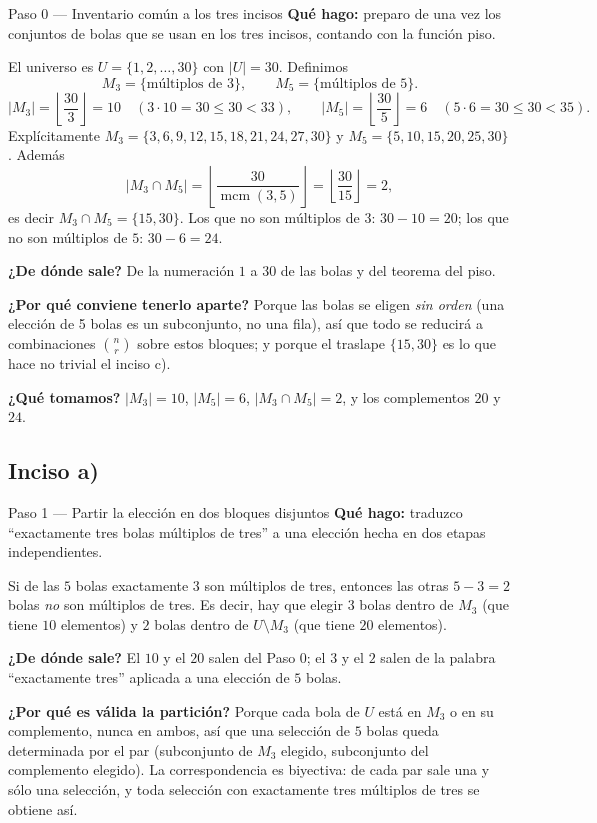 \documentclass[11pt]{article}
\begin{document}
\begin{paso}{Paso 0 --- Inventario común a los tres incisos}
\textbf{Qué hago:} preparo de una vez los conjuntos de bolas que se usan en los tres incisos, contando con la función piso.

El universo es $U=\{1,2,\dots,30\}$ con $|U|=30$. Definimos
\[
M_3 = \{\text{múltiplos de }3\},\qquad M_5=\{\text{múltiplos de }5\} .
\]
\[
|M_3| = \left\lfloor \frac{30}{3}\right\rfloor = 10 \quad (3\cdot 10 = 30\le 30 < 33), \qquad
|M_5| = \left\lfloor \frac{30}{5}\right\rfloor = 6 \quad (5\cdot 6 = 30\le 30 < 35).
\]
Explícitamente $M_3=\{3,6,9,12,15,18,21,24,27,30\}$ y $M_5=\{5,10,15,20,25,30\}$. Además
\[
|M_3\cap M_5| = \left\lfloor \frac{30}{\operatorname{mcm}(3,5)}\right\rfloor = \left\lfloor \frac{30}{15}\right\rfloor = 2 ,
\]
es decir $M_3\cap M_5=\{15,30\}$. Los que no son múltiplos de $3$: $30-10=20$; los que no son múltiplos de $5$: $30-6=24$.

\textbf{¿De dónde sale?} De la numeración $1$ a $30$ de las bolas y del teorema del piso.

\textbf{¿Por qué conviene tenerlo aparte?} Porque las bolas se eligen \emph{sin orden} (una elección de 5 bolas es un subconjunto, no una fila), así que todo se reducirá a combinaciones $\binom{n}{r}$ sobre estos bloques; y porque el traslape $\{15,30\}$ es lo que hace no trivial el inciso c).

\textbf{¿Qué tomamos?} $|M_3|=10$, $|M_5|=6$, $|M_3\cap M_5|=2$, y los complementos $20$ y $24$.
\end{paso}

\subsection*{Inciso a)}

\begin{paso}{Paso 1 --- Partir la elección en dos bloques disjuntos}
\textbf{Qué hago:} traduzco ``exactamente tres bolas múltiplos de tres'' a una elección hecha en dos etapas independientes.

Si de las $5$ bolas exactamente $3$ son múltiplos de tres, entonces las otras $5-3=2$ bolas \emph{no} son múltiplos de tres. Es decir, hay que elegir $3$ bolas dentro de $M_3$ (que tiene $10$ elementos) y $2$ bolas dentro de $U\setminus M_3$ (que tiene $20$ elementos).

\textbf{¿De dónde sale?} El $10$ y el $20$ salen del Paso 0; el $3$ y el $2$ salen de la palabra ``exactamente tres'' aplicada a una elección de $5$ bolas.

\textbf{¿Por qué es válida la partición?} Porque cada bola de $U$ está en $M_3$ o en su complemento, nunca en ambos, así que una selección de $5$ bolas queda determinada por el par (subconjunto de $M_3$ elegido, subconjunto del complemento elegido). La correspondencia es biyectiva: de cada par sale una y sólo una selección, y toda selección con exactamente tres múltiplos de tres se obtiene así.
\end{paso}
\end{document}
